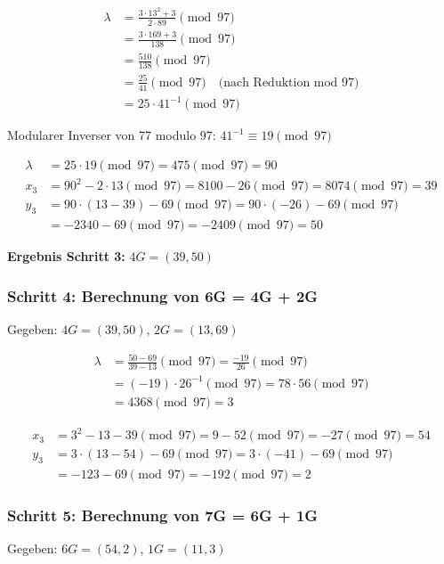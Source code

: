 \documentclass{article}
\begin{document}
\begin{align}
\lambda &= \frac{3 \cdot 13^2 + 3}{2 \cdot 89} \pmod{97} \\
&= \frac{3 \cdot 169 + 3}{138} \pmod{97} \\
&= \frac{510}{138} \pmod{97} \\
&= \frac{25}{41} \pmod{97} \quad \text{(nach Reduktion mod 97)} \\
&= 25 \cdot 41^{-1} \pmod{97}
\end{align}

Modularer Inverser von 77 modulo 97: $41^{-1} \equiv 19 \pmod{97}$

\begin{align}
\lambda &= 25 \cdot 19 \pmod{97} = 475 \pmod{97} = 90 \\
x_3 &= 90^2 - 2 \cdot 13 \pmod{97} = 8100 - 26 \pmod{97} = 8074 \pmod{97} = 39 \\
y_3 &= 90 \cdot (13 - 39) - 69 \pmod{97} = 90 \cdot (-26) - 69 \pmod{97} \\
&= -2340 - 69 \pmod{97} = -2409 \pmod{97} = 50
\end{align}

\begin{solutionbox}
\textbf{Ergebnis Schritt 3:} $4G = (39, 50)$
\end{solutionbox}

\subsubsection{Schritt 4: Berechnung von 6G = 4G + 2G}
Gegeben: $4G = (39, 50)$, $2G = (13, 69)$

\begin{align}
\lambda &= \frac{50 - 69}{39 - 13} \pmod{97} = \frac{-19}{26} \pmod{97} \\
&= (-19) \cdot 26^{-1} \pmod{97} = 78 \cdot 56 \pmod{97} \\
&= 4368 \pmod{97} = 3
\end{align}

\begin{align}
x_3 &= 3^2 - 13 - 39 \pmod{97} = 9 - 52 \pmod{97} = -27 \pmod{97} = 54 \\
y_3 &= 3 \cdot (13 - 54) - 69 \pmod{97} = 3 \cdot (-41) - 69 \pmod{97} \\
&= -123 - 69 \pmod{97} = -192 \pmod{97} = 2
\end{align}

\subsubsection{Schritt 5: Berechnung von 7G = 6G + 1G}
Gegeben: $6G = (54, 2)$, $1G = (11, 3)$
\end{document}
